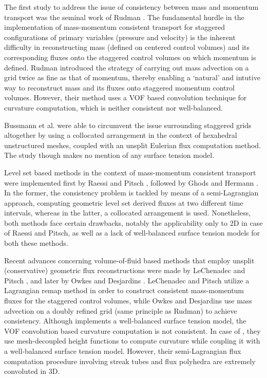 
The first study to address the issue of consistency between mass 
and momentum transport was the seminal work of Rudman .
The fundamental hurdle in the implementation of mass-momentum 
consistent transport for staggered configurations of primary variables 
(pressure and velocity) is the inherent difficulty in reconstructing mass 
(defined on centered control volumes) and its corresponding fluxes 
onto the staggered control volumes on which momentum is defined. 
Rudman introduced the strategy of carrying out mass advection 
on a grid twice as fine as that of momentum, 
thereby enabling a `natural' and intutive 
way to reconstruct mass and its fluxes onto staggered momentum control volumes. 
However, their method uses a VOF based convolution technique for curvature computation, 
which is neither consistent nor well-balanced.    


Bussmann et al.  were able to 
circumvent the issue surrounding staggered grids altogether 
by using a collocated arrangement in the context of hexahedral 
unstructured meshes, coupled with an unsplit Eulerian flux computation method.    
The study though makes no mention of any surface tension model. 


Level set based methods in the context of mass-momentum consistent 
transport were implemented first by Raessi and Pitsch , 
followed by Ghods and Hermann \cite{ghods2013consistent}. 
In the former, the consistency problem is tackled by means of a 
semi-Lagrangian approach, computing geometric level set derived 
fluxes at two different time intervals, whereas in the latter, 
a collocated arrangement is used. 
Nonetheless, both methods face certain drawbacks, notably the 
applicability only to 2D in case of Raessi and Pitsch, 
as well as a lack of well-balanced surface tension models for both these methods.   


Recent advances concerning volume-of-fluid based methods that 
employ unsplit (conservative) geometric flux reconstructions 
were made by LeChenadec and Pitsch 
, and later by Owkes and Desjardins \cite{owkes2017mass}. 
LeChenadec and Pitsch utilize a Lagrangian remap method in order 
to construct consistent mass-momentum fluxes for the staggered control volumes, 
while Owkes and Desjardins use mass advection on a doubly refined grid 
(same principle as Rudman) to achieve consistency.     
Although \cite{le2013monotonicity} implements a well-balanced surface tension model, 
the VOF convolution based curvature computation is not consistent. 
In case of , they use mesh-decoupled height functions 
to compute curvature while coupling it with a well-balanced surface tension model. 
However, their semi-Lagrangian flux computation procedure 
involving streak tubes and flux polyhedra are extremely convoluted in 3D.     


